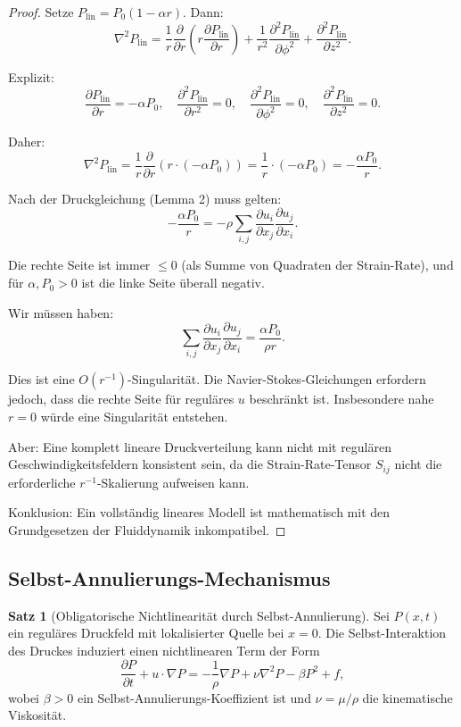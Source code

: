 \documentclass[a4paper,12pt]{article}
\theoremstyle{definition}
\newtheorem{satz}{Satz}
\begin{document}
\begin{proof}
Setze $P_{\text{lin}} = P_0(1 - \alpha r)$. Dann:
\[
\nabla^2 P_{\text{lin}} = \frac{1}{r} \frac{\partial}{\partial r}\left(r \frac{\partial P_{\text{lin}}}{\partial r}\right) + \frac{1}{r^2} \frac{\partial^2 P_{\text{lin}}}{\partial \phi^2} + \frac{\partial^2 P_{\text{lin}}}{\partial z^2}.
\]

Explizit:
\[
\frac{\partial P_{\text{lin}}}{\partial r} = -\alpha P_0, \quad \frac{\partial^2 P_{\text{lin}}}{\partial r^2} = 0, \quad \frac{\partial^2 P_{\text{lin}}}{\partial \phi^2} = 0, \quad \frac{\partial^2 P_{\text{lin}}}{\partial z^2} = 0.
\]

Daher:
\[
\nabla^2 P_{\text{lin}} = \frac{1}{r} \frac{\partial}{\partial r}\left(r \cdot (-\alpha P_0)\right) = \frac{1}{r} \cdot (-\alpha P_0) = -\frac{\alpha P_0}{r}.
\]

Nach der Druckgleichung (Lemma 2) muss gelten:
\[
-\frac{\alpha P_0}{r} = -\rho \sum_{i,j} \frac{\partial u_i}{\partial x_j} \frac{\partial u_j}{\partial x_i}.
\]

Die rechte Seite ist immer $\leq 0$ (als Summe von Quadraten der Strain-Rate), und für $\alpha, P_0 > 0$ ist die linke Seite überall negativ.

Wir müssen haben:
\[
\sum_{i,j} \frac{\partial u_i}{\partial x_j} \frac{\partial u_j}{\partial x_i} = \frac{\alpha P_0}{\rho r}.
\]

Dies ist eine $O(r^{-1})$-Singularität. Die Navier-Stokes-Gleichungen erfordern jedoch, dass die rechte Seite für reguläres $u$ beschränkt ist. Insbesondere nahe $r=0$ würde eine Singularität entstehen.

Aber: Eine komplett lineare Druckverteilung kann nicht mit regulären Geschwindigkeitsfeldern konsistent sein, da die Strain-Rate-Tensor $S_{ij}$ nicht die erforderliche $r^{-1}$-Skalierung aufweisen kann.

Konklusion: Ein vollständig lineares Modell ist mathematisch mit den Grundgesetzen der Fluiddynamik inkompatibel.
\end{proof}

\subsection{Selbst-Annulierungs-Mechanismus}

\begin{satz}[Obligatorische Nichtlinearität durch Selbst-Annulierung]
\label{satz:self-annihilation}
Sei $P(x,t)$ ein reguläres Druckfeld mit lokalisierter Quelle bei $x=0$. Die Selbst-Interaktion des Druckes induziert einen nichtlinearen Term der Form
\[
\frac{\partial P}{\partial t} + u \cdot \nabla P = -\frac{1}{\rho} \nabla P + \nu \nabla^2 P - \beta P^2 + f,
\]
wobei $\beta > 0$ ein Selbst-Annulierungs-Koeffizient ist und $\nu = \mu/\rho$ die kinematische Viskosität.
\end{satz}
\end{document}
